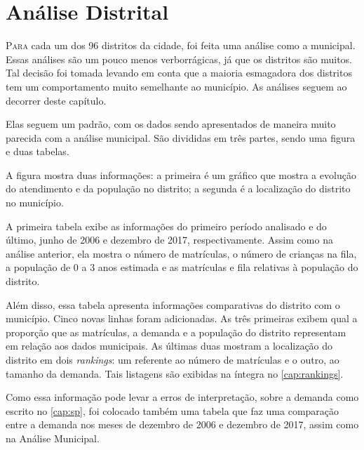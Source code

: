 \chapter{Análise Distrital}
\label{cap:dist}

\lettrine{P}{ara} cada um dos 96 distritos da cidade, foi feita uma análise como a municipal. Essas análises são um pouco menos verborrágicas, já que os distritos são muitos. Tal decisão foi tomada levando em conta que a maioria esmagadora dos distritos tem um comportamento muito semelhante ao município. As análises seguem ao decorrer deste capítulo.

Elas seguem um padrão, com os dados sendo apresentados de maneira muito parecida com a análise municipal. São divididas em três partes, sendo uma figura e duas tabelas.

A figura mostra duas informações: a primeira é um gráfico que mostra a evolução do atendimento e da população no distrito; a segunda é a localização do distrito no município.

A primeira tabela exibe as informações do primeiro período analisado e do último, junho de 2006 e dezembro de 2017, respectivamente. Assim como na análise anterior, ela mostra o número de matrículas, o número de crianças na fila, a população de 0 a 3 anos estimada e as matrículas e fila relativas à população do distrito.

Além disso, essa tabela apresenta informações comparativas do distrito com o município. Cinco novas linhas foram adicionadas. As três primeiras exibem qual a proporção que as matrículas, a demanda e a população do distrito representam em relação aos dados municipais. As últimas duas mostram a localização do distrito em dois \textit{rankings}: um referente ao número de matrículas e o outro, ao tamanho da demanda. Tais listagens são exibidas na íntegra no \autoref{cap:rankings}.

Como essa informação pode levar a erros de interpretação, sobre a demanda como escrito no \autoref{cap:sp}, foi colocado também uma tabela que faz uma comparação entre a demanda nos meses de dezembro de 2006 e dezembro de 2017, assim como na Análise Municipal.